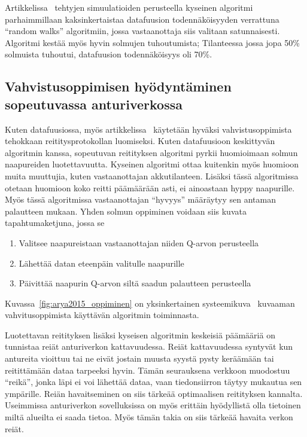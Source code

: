 Artikkelissa~\cite{Yu2006} tehtyjen simuulatioiden perusteella kyseinen
algoritmi parhaimmillaan kaksinkertaistaa datafuusion todennäköisyyden
verrattuna ``random walks'' algoritmiin, jossa vastaanottaja siis valitaan
satunnaisesti. Algoritmi kestää myös hyvin solmujen tuhoutumista; Tilanteessa
jossa jopa 50\% solmuista tuhoutui, datafuusion todennäköisyys oli 70\%.

\subsection{Vahvistusoppimisen hyödyntäminen sopeutuvassa anturiverkossa}

Kuten datafuusiossa, myös artikkelissa~\cite{Arya2015} käytetään hyväksi
vahvistusoppimista tehokkaan reititysprotokollan luomiseksi. Kuten datafuusioon
keskittyvän algoritmin kanssa, sopeutuvan reitityksen algoritmi pyrkii
huomioimaan solmun naapureiden luotettavuutta. Kyseinen algoritmi ottaa
kuitenkin myös huomioon muita muuttujia, kuten vastaanottajan akkutilanteen.
Lisäksi tässä algoritmissa otetaan huomioon koko reitti päämäärään asti, ei
ainoastaan hyppy naapurille. Myös tässä algoritmissa vastaanottajan ``hyvyys''
määräytyy sen antaman palautteen mukaan. Yhden solmun oppiminen voidaan siis
kuvata tapahtumaketjuna, jossa se
\begin{enumerate}
  \item Valitsee naapureistaan vastaanottajan niiden Q-arvon perusteella
  \item Lähettää datan eteenpäin valitulle naapurille
  \item Päivittää naapurin Q-arvon siltä saadun palautteen perusteella
\end{enumerate}
Kuvassa~\ref{fig:arya2015_oppiminen} on yksinkertainen
systeemikuva~\cite{Arya2015} kuvaaman vahvitusoppimista käyttävän algoritmin
toiminnasta.

Luotettavan reitityksen lisäksi kyseisen algoritmin keskeisiä päämääriä on
tunnistaa reiät anturiverkon kattavuudessa. Reiät kattavuudessa syntyvät kun
antureita vioittuu tai ne eivät jostain muusta syystä pysty keräämään tai
reitittämään dataa tarpeeksi hyvin. Tämän seurauksena verkkoon muodostuu
``reikä'', jonka läpi ei voi lähettää dataa, vaan tiedonsiirron täytyy mukautua
sen ympärille. Reiän havaitseminen on siis tärkeää optimaalisen reitityksen
kannalta. Useimmissa anturiverkon sovelluksissa on myös erittäin hyödyllistä
olla tietoinen miltä alueilta ei saada tietoa. Myös tämän takia on siis tärkeää
havaita verkon reiät.


